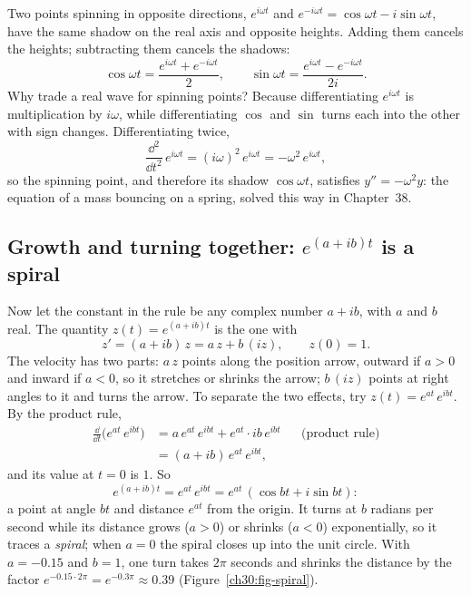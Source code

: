 Two points spinning in opposite directions, $e^{i\omega t}$ and $e^{-i\omega t} = \cos\omega t - i\sin\omega t$, have the same shadow on the real axis and opposite heights. Adding them cancels the heights; subtracting them cancels the shadows:
\[
  \cos\omega t = \frac{e^{i\omega t} + e^{-i\omega t}}{2},
  \qquad
  \sin\omega t = \frac{e^{i\omega t} - e^{-i\omega t}}{2i}.
\]
Why trade a real wave for spinning points? Because differentiating $e^{i\omega t}$ is multiplication by $i\omega$, while differentiating $\cos$ and $\sin$ turns each into the other with sign changes. Differentiating twice,
\[
  \frac{\dd^2}{\dd t^2}\,e^{i\omega t} = (i\omega)^2\, e^{i\omega t} = -\omega^2\, e^{i\omega t},
\]
so the spinning point, and therefore its shadow $\cos\omega t$, satisfies $y'' = -\omega^2 y$: the equation of a mass bouncing on a spring, solved this way in Chapter~38.

\subsection{\texorpdfstring{Growth and turning together: $e^{(a+ib)t}$ is a spiral}{Growth and turning together: the spiral}}
\label{ch30:sec-euler-spiral}

Now let the constant in the rule be any complex number $a + ib$, with $a$ and $b$ real. The quantity $z(t) = e^{(a+ib)t}$ is the one with
\[
  z' = (a + ib)\,z = a\,z + b\,(iz), \qquad z(0) = 1.
\]
The velocity has two parts: $a\,z$ points along the position arrow, outward if $a > 0$ and inward if $a < 0$, so it stretches or shrinks the arrow; $b\,(iz)$ points at right angles to it and turns the arrow. To separate the two effects, try $z(t) = e^{at}\,e^{ibt}$. By the product rule,
\begin{align*}
  \frac{\dd}{\dd t}\bigl(e^{at}\,e^{ibt}\bigr)
  &= a\,e^{at}\,e^{ibt} + e^{at}\cdot ib\,e^{ibt} && \text{(product rule)}\\
  &= (a + ib)\,e^{at}\,e^{ibt},
\end{align*}
and its value at $t = 0$ is $1$. So
\[
  e^{(a+ib)t} = e^{at}\,e^{ibt} = e^{at}\,(\cos bt + i\sin bt):
\]
a point at angle $bt$ and distance $e^{at}$ from the origin. It turns at $b$ radians per second while its distance grows ($a > 0$) or shrinks ($a < 0$) exponentially, so it traces a \emph{spiral}; when $a = 0$ the spiral closes up into the unit circle. With $a = -0.15$ and $b = 1$, one turn takes $2\pi$ seconds and shrinks the distance by the factor $e^{-0.15\cdot 2\pi} = e^{-0.3\pi} \approx 0.39$ (Figure~\ref{ch30:fig-spiral}).

